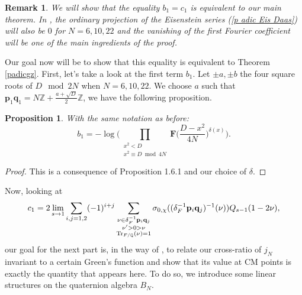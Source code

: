 \documentclass[a4paper,12pt]{article}
\newtheorem{proposition}[theorem]{Proposition}
\newtheorem{remark}[theorem]{Remark}
\begin{document}
\begin{remark}
    We will show that the equality $b_1=c_1$ is equivalent to our main theorem. In \cite{Daas}, the ordinary projection of the Eisenstein series (\ref{p adic Eis Daas}) will also be $0$ for $N=6,10,22$ and the vanishing of the first Fourier coefficient will be one of the main ingredients of the proof.
\end{remark}
Our goal now will be to show that this equality is equivalent to Theorem \ref{padicgz}. First, let's take a look at the first term $b_1$. Let $\pm a,\pm b$ the four square roots of $D \mod 2N$ when $N=6,10,22$. We choose $a$ such that $\mathbf{p}_1\mathbf{q}_1=N\mathbb{Z}+\frac{a+\sqrt{D}}{2}\mathbb{Z}$, we have the following proposition.
\begin{proposition}\label{prop b1} With the same notation as before:
    \[b_1=-\log\Biggl(\prod_{\substack{x^2<D\\x^2\equiv D \bmod{4N}}}\mathbf{F}\biggl(\frac{D-x^2}{4N}\biggl)^{\delta(x)}\Biggl).\]
\end{proposition}
\begin{proof}
This is a consequence of \cite{Daas} Proposition 1.6.1 and our choice of $\delta$.
\end{proof}
Now, looking at \[c_1=2\lim_{s\rightarrow 1} \sum_{i,j=1,2}(-1)^{i+j}\sum_{\substack{\nu\in \delta_F^{-1}\mathbf{p}_i\mathbf{q}_j\\ \nu'>0>\nu\\ \textup{Tr}_{F/\mathbb{Q}}(\nu)=1}}\sigma_{0,\chi}((\delta_F^{-1}\mathbf{p}_i\mathbf{q}_j)^{-1}(\nu))Q_{s-1}(1-2\nu),\]
 our goal for the next part is, in the way of \cite{GrossZagier84}, to relate our cross-ratio of $j_N$ invariant to a certain Green's function and show that its value at CM points is exactly the quantity that appears here. To do so, we introduce some linear structures on the quaternion algebra $B_N$. 
\end{document}
